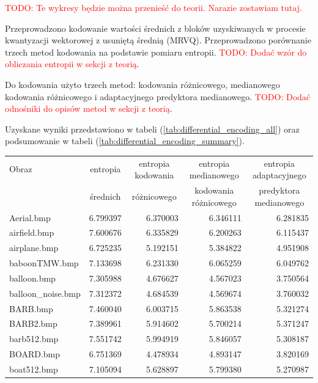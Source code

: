 \documentclass{article}
\newcommand{\todo}[1]{\textcolor{red}{TODO: #1}}
\begin{document}
\todo{Te wykresy będzie można przenieść do teorii. Narazie zostawiam tutaj.}

Przeprowadzono kodowanie wartości średnich z bloków uzyskiwanych w procesie kwantyzacji wektorowej z usuniętą średnią (MRVQ). Przeprowadzono porównanie trzech metod kodowania na podstawie pomiaru entropii. \todo{Dodać wzór do obliczania entropii w sekcji z teorią}.

Do kodowania użyto trzech metod: kodowania różnicowego, medianowego kodowania różnicowego i adaptacyjnego predyktora medianowego.
\todo{Dodać odnośniki do opisów metod w sekcji z teorią}.

Uzyskane wyniki przedstawiono w tabeli (\ref{tab:differential_encoding_all}) oraz podsumowanie w tabeli (\ref{tab:differential_encoding_summary}).

\begin{table}
    \centering
    \begin{tabular}{lrrrr}
    \toprule
        {Obraz} & \multicolumn{1}{c}{entropia} & \multicolumn{1}{c}{entropia kodowania} & \multicolumn{1}{c}{entropia medianowego} & \multicolumn{1}{c}{entropia adaptacyjnego} \\
        {} & \multicolumn{1}{c}{średnich} & \multicolumn{1}{c}{różnicowego} & \multicolumn{1}{c}{kodowania różnicowego} & \multicolumn{1}{c}{predyktora medianowego} \\
    \midrule
            Aerial.bmp &  6.799397 &  6.370003 &  6.346111 &  6.281835 \\
          airfield.bmp &  7.600676 &  6.335829 &  6.200263 &  6.115437 \\
          airplane.bmp &  6.725235 &  5.192151 &  5.384822 &  4.951908 \\
         baboonTMW.bmp &  7.133698 &  6.231330 &  6.065259 &  6.049762 \\
           balloon.bmp &  7.305988 &  4.676627 &  4.567023 &  3.750564 \\
     balloon\_noise.bmp &  7.312372 &  4.684539 &  4.569674 &  3.760032 \\
              BARB.bmp &  7.460040 &  6.003715 &  5.863538 &  5.321274 \\
             BARB2.bmp &  7.389961 &  5.914602 &  5.700214 &  5.371247 \\
           barb512.bmp &  7.551742 &  5.994919 &  5.846057 &  5.308187 \\
             BOARD.bmp &  6.751369 &  4.478934 &  4.893147 &  3.820169 \\
           boat512.bmp &  7.105094 &  5.628897 &  5.799380 &  5.270987 \\

\end{tabular}
\end{table}
\end{document}
